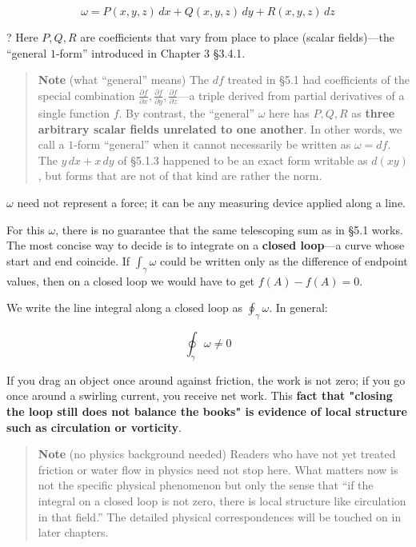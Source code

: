 \[\omega = P(x,y,z)\,dx + Q(x,y,z)\,dy + R(x,y,z)\,dz\]

? Here \(P, Q, R\) are coefficients that vary from place to place
(scalar fields)---the ``general \(1\)-form'' introduced in Chapter 3
§3.4.1.

\begin{quote}
\textbf{Note} (what ``general'' means) The \(df\) treated in §5.1 had
coefficients of the special combination
\(\frac{\partial f}{\partial x}, \frac{\partial f}{\partial y}, \frac{\partial f}{\partial z}\)---a
triple derived from partial derivatives of a single function \(f\). By
contrast, the ``general'' \(\omega\) here has \(P, Q, R\) as
\textbf{three arbitrary scalar fields unrelated to one another}. In
other words, we call a \(1\)-form ``general'' when it cannot necessarily
be written as \(\omega = df\). The \(y\,dx + x\,dy\) of §5.1.3 happened
to be an exact form writable as \(d(xy)\), but forms that are not of
that kind are rather the norm.
\end{quote}

\(\omega\) need not represent a force; it can be any measuring device
applied along a line.

For this \(\omega\), there is no guarantee that the same telescoping sum
as in §5.1 works. The most concise way to decide is to integrate on a
\textbf{closed loop}---a curve whose start and end coincide. If
\(\int_\gamma \omega\) could be written only as the difference of
endpoint values, then on a closed loop we would have to get
\(f(A)-f(A)=0\).

We write the line integral along a closed loop as
\(\oint_\gamma \omega\). In general:

\[\oint_\gamma \omega \neq 0\]

If you drag an object once around against friction, the work is not
zero; if you go once around a swirling current, you receive net work.
This
\textbf{fact that "closing the loop still does not balance the books" is evidence of local structure such as circulation or vorticity}.

\begin{quote}
\textbf{Note} (no physics background needed) Readers who have not yet
treated friction or water flow in physics need not stop here. What
matters now is not the specific physical phenomenon but only the sense
that ``if the integral on a closed loop is not zero, there is local
structure like circulation in that field.'' The detailed physical
correspondences will be touched on in later chapters.
\end{quote}

